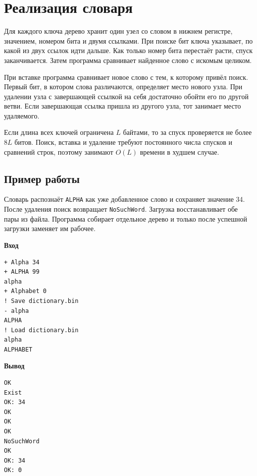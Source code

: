 \section{Реализация словаря}
\label{sec:implementation}
\begingroup
\raggedright

Для каждого ключа дерево хранит один узел со словом в нижнем регистре, значением, номером бита и двумя ссылками. При поиске бит ключа указывает, по какой из двух ссылок идти дальше. Как только номер бита перестаёт расти, спуск заканчивается. Затем программа сравнивает найденное слово с искомым целиком.

При вставке программа сравнивает новое слово с тем, к которому привёл поиск. Первый бит, в котором слова различаются, определяет место нового узла. При удалении узла с завершающей ссылкой на себя достаточно обойти его по другой ветви. Если завершающая ссылка пришла из другого узла, тот занимает место удаляемого.

Если длина всех ключей ограничена \(L\) байтами, то за спуск проверяется не более \(8L\) битов. Поиск, вставка и удаление требуют постоянного числа спусков и сравнений строк, поэтому занимают \(O(L)\) времени в худшем случае.

\clearpage
\subsection{Пример работы}

Словарь распознаёт \texttt{ALPHA} как уже добавленное слово и сохраняет значение 34. После удаления поиск возвращает \texttt{NoSuchWord}. Загрузка восстанавливает обе пары из файла. Программа собирает отдельное дерево и только после успешной загрузки заменяет им рабочее.

\begin{minipage}[t]{0.53\linewidth}
\textbf{Вход}
\begin{lstlisting}[language={},numbers=none]
+ Alpha 34
+ ALPHA 99
alpha
+ Alphabet 0
! Save dictionary.bin
- alpha
ALPHA
! Load dictionary.bin
alpha
ALPHABET
\end{lstlisting}
\end{minipage}\hfill
\begin{minipage}[t]{0.40\linewidth}
\textbf{Вывод}
\begin{lstlisting}[language={},numbers=none]
OK
Exist
OK: 34
OK
OK
OK
NoSuchWord
OK
OK: 34
OK: 0
\end{lstlisting}
\end{minipage}
\par
\endgroup
